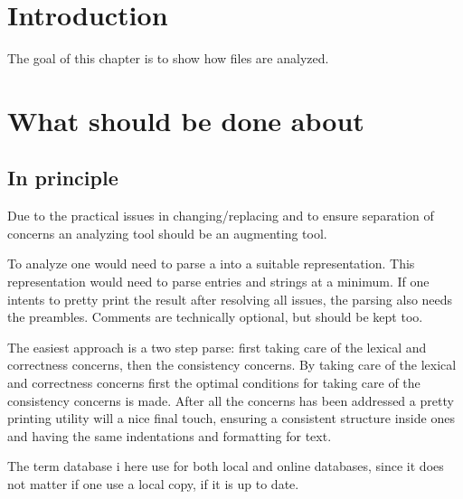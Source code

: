 

\section{Introduction}
The goal of this chapter is to show how {\bibtex} files are analyzed.


\section{What should be done about {\bibtex}}
\subsection{In principle}

Due to the practical issues in changing/replacing {\bibtex} and to
ensure separation of concerns an analyzing tool should be an
augmenting tool.

To analyze {\bibtex} one would need to parse a  into a
suitable representation.  This representation would need to parse
{\bibtex} entries and strings at a minimum.  If one intents to pretty
print the result after resolving all issues, the parsing also needs
the preambles.  Comments are technically optional, but should be kept
too.

The easiest approach is a two step parse: first taking care of the
lexical and correctness concerns, then the consistency concerns.  By
taking care of the lexical and correctness concerns first the optimal
conditions for taking care of the consistency concerns is made.  After
all the concerns has been addressed a pretty printing utility will a
nice final touch, ensuring a consistent structure inside ones
 and having the same indentations and formatting for text.

The term database i here use for both local and online databases,
since it does not matter if one use a local copy, if it is up to date.

